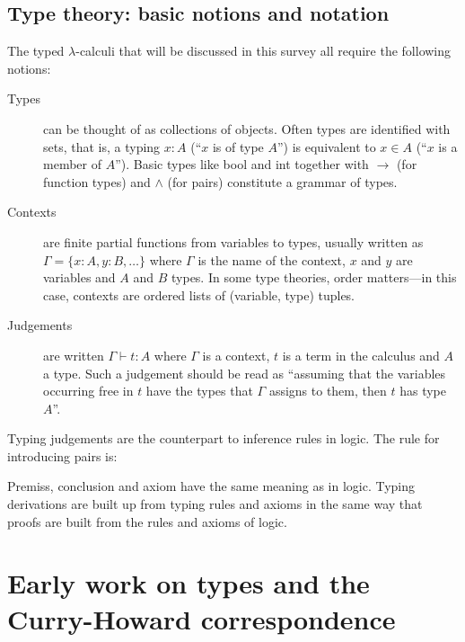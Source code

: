 \documentclass[12pt,toc=bibliography,numbers=noendperiod,
               footnotes=multiple,twoside]{scrartcl}
\begin{document}
\subsection{Type theory: basic notions and notation}

The typed \(\lambda\)-calculi that will be discussed in this survey all require the following notions:

\begin{description}
\item[Types] can be thought of as collections of objects. Often types are identified with sets, that is, a typing \(x:A\) (\enquote{\(x\) is of type \(A\)}) is equivalent to \(x \in A\) (\enquote{\(x\) is a member of \(A\)}). Basic types like bool and int together with \(\rightarrow\) (for function types) and \(\wedge\) (for pairs) constitute a grammar of types.
\item[Contexts] are finite partial functions from variables to types, usually written as \(\Gamma = \{x:A,y:B,\dots\}\) where \(\Gamma\) is the name of the context, \(x\) and \(y\) are variables and \(A\) and \(B\) types. In some type theories, order matters---in this case, contexts are ordered lists of (variable, type) tuples.
\item[Judgements] are written \(\Gamma \vdash t:A\) where \(\Gamma\) is a context, \(t\) is a term in the calculus and \(A\) a type. Such a judgement should be read as \enquote{assuming that the variables occurring free in \(t\) have the types that \(\Gamma\) assigns to them, then \(t\) has type \(A\)}.
\end{description}

Typing judgements are the counterpart to inference rules in logic. The rule for introducing pairs is:

\begin{figure}[h]
\begin{prooftree}
\end{prooftree}
\end{figure}

Premiss, conclusion and axiom have the same meaning as in logic. Typing derivations are built up from typing rules and axioms in the same way that proofs are built from the rules and axioms of logic.

\section{Early work on types and the Curry-Howard correspondence}
\end{document}
